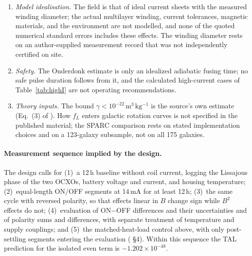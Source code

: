 \documentclass[12pt,a4paper]{article}
\begin{document}
\begin{enumerate}
during the OFF intervals. The purpose of the equal-total-power control with a small residual magnetic field is to
reduce switching-correlated thermal changes. Temperature matching between the ON and OFF states and the residual field
of the control must be verified by measurement; any remaining mismatch must be included in the uncertainty of the
frequency estimate. Equal total power does not guarantee identical spatial heat deposition or identical conductive
and radiative coupling to the clocks.
\item \emph{Model idealisation.} The field is that of ideal current sheets with the measured winding diameter; the
actual multilayer winding, current tolerances, magnetic materials, and the environment are not modelled, and none of
the quoted numerical standard errors includes these effects. The winding diameter rests on an author-supplied
measurement record that was not independently certified on site.
\item \emph{Safety.} The Onderdonk estimate is only an idealized adiabatic fusing time; no safe pulse duration follows
from it, and the calculated high-current cases of Table~\ref{tab:highI} are not operating recommendations.
\item \emph{Theory inputs.} The bound $\gamma<10^{-22}\,\mathrm{m^3\,kg^{-1}}$ is the source's own estimate
(Eq.~(3) of \cite{TAL_formalism}). How $f_L$ enters galactic rotation curves is not specified in the published
material; the SPARC comparison rests on stated implementation choices and on a 123-galaxy subsample, not on all 175
galaxies.
\end{enumerate}

\paragraph{Measurement sequence implied by the design.}
The design calls for (1)~a 12\,h baseline without coil current, logging the Lissajous phase of the two OCXOs, battery
voltage and current, and housing temperature; (2)~equal-length ON/OFF segments at 14\,mA for at least 12\,h;
(3)~the same cycle with reversed polarity, so that effects linear in $B$ change sign while $B^2$ effects do not;
(4)~evaluation of ON$-$OFF differences and their uncertainties and of polarity sums and differences, with separate
treatment of temperature and supply couplings; and (5)~the matched-heat-load control above, with only post-settling
segments entering the evaluation ( \S4). Within this sequence the TAL prediction for the isolated
even term is $-1.202\times10^{-48}$.
\end{document}

